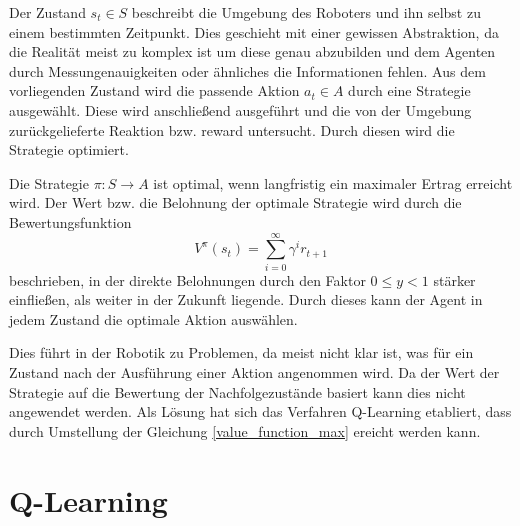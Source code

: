 Der Zustand $s_t \in S$ beschreibt die Umgebung des Roboters und ihn selbst zu einem bestimmten Zeitpunkt. Dies geschieht mit einer gewissen Abstraktion, da die Realität meist zu komplex ist um diese genau abzubilden und dem Agenten durch Messungenauigkeiten oder ähnliches die Informationen fehlen. Aus dem vorliegenden Zustand wird die passende Aktion $a_t \in A$ durch eine Strategie ausgewählt. Diese wird anschließend ausgeführt und die von der Umgebung zurückgelieferte Reaktion bzw. reward untersucht. Durch diesen wird die Strategie optimiert. \cite{Ertel_2013}\par
Die Strategie $\pi: S \rightarrow A$ ist optimal, wenn langfristig ein maximaler Ertrag erreicht wird. Der Wert bzw. die Belohnung der  optimale Strategie wird durch die Bewertungsfunktion 
\begin{equation}
	V^{\pi}(s_t) = \sum_{i=0}^{\infty}\gamma^{i}r_{t+1}
\end{equation}
\label{value_function_max}
beschrieben, in der direkte Belohnungen durch den Faktor $0 \le y < 1$ stärker einfließen, als weiter in der Zukunft liegende. Durch dieses kann der Agent in jedem Zustand die optimale Aktion auswählen. \cite{Ertel_2013}\par
Dies führt in der Robotik zu Problemen, da meist nicht klar ist, was für ein Zustand nach der Ausführung einer Aktion angenommen wird. Da der Wert der Strategie auf die Bewertung der Nachfolgezustände basiert kann dies nicht angewendet werden. Als Lösung hat sich das Verfahren Q-Learning etabliert, dass durch Umstellung der Gleichung \ref{value_function_max} ereicht werden kann.

\section{Q-Learning} %
\label{sec:q_learning}

